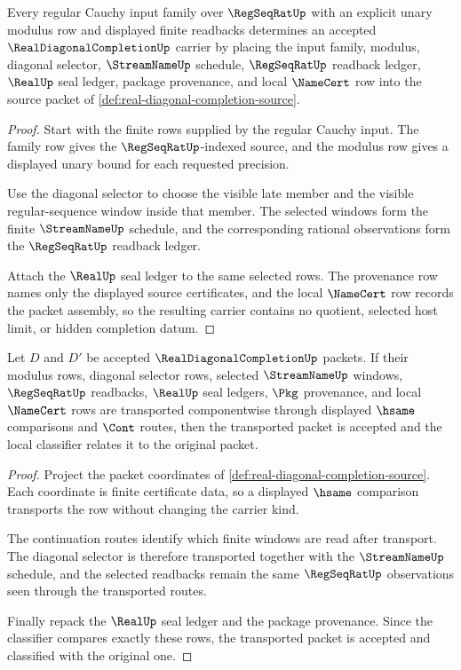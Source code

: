 \begin{theorem}
\label{thm:real-diagonal-completion-carrier}
Every regular Cauchy input family over $\RegSeqRatUp$ with an explicit unary modulus row and displayed finite readbacks determines an accepted $\RealDiagonalCompletionUp$ carrier by placing the input family, modulus, diagonal selector, $\StreamNameUp$ schedule, $\RegSeqRatUp$ readback ledger, $\RealUp$ seal ledger, package provenance, and local $\NameCert$ row into the source packet of \autoref{def:real-diagonal-completion-source}.
\end{theorem}
\begin{proof}
Start with the finite rows supplied by the regular Cauchy input. The family row gives the $\RegSeqRatUp$-indexed source, and the modulus row gives a displayed unary bound for each requested precision.

Use the diagonal selector to choose the visible late member and the visible regular-sequence window inside that member. The selected windows form the finite $\StreamNameUp$ schedule, and the corresponding rational observations form the $\RegSeqRatUp$ readback ledger.

Attach the $\RealUp$ seal ledger to the same selected rows. The provenance row names only the displayed source certificates, and the local $\NameCert$ row records the packet assembly, so the resulting carrier contains no quotient, selected host limit, or hidden completion datum.
\end{proof}

\begin{theorem}
\label{thm:real-diagonal-completion-classifier-stability}
Let $D$ and $D'$ be accepted $\RealDiagonalCompletionUp$ packets. If their modulus rows, diagonal selector rows, selected $\StreamNameUp$ windows, $\RegSeqRatUp$ readbacks, $\RealUp$ seal ledgers, $\Pkg$ provenance, and local $\NameCert$ rows are transported componentwise through displayed $\hsame$ comparisons and $\Cont$ routes, then the transported packet is accepted and the local classifier relates it to the original packet.
\end{theorem}
\begin{proof}
Project the packet coordinates of \autoref{def:real-diagonal-completion-source}. Each coordinate is finite certificate data, so a displayed $\hsame$ comparison transports the row without changing the carrier kind.

The continuation routes identify which finite windows are read after transport. The diagonal selector is therefore transported together with the $\StreamNameUp$ schedule, and the selected readbacks remain the same $\RegSeqRatUp$ observations seen through the transported routes.

Finally repack the $\RealUp$ seal ledger and the package provenance. Since the classifier compares exactly these rows, the transported packet is accepted and classified with the original one.
\end{proof}


